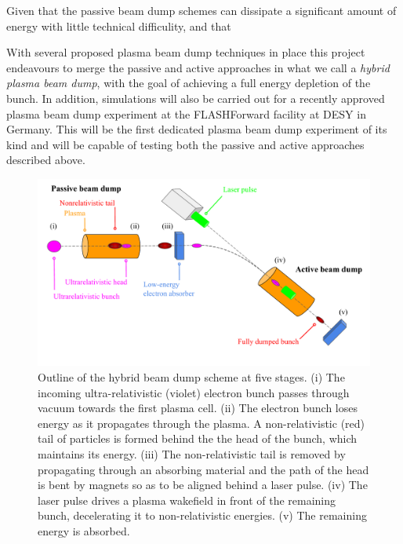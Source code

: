 Given that the passive beam dump schemes can dissipate a significant amount of energy with little technical difficulity, and that 

With several proposed plasma beam dump techniques in place this project endeavours to merge the passive and active approaches in what we call a \textit{hybrid plasma beam dump}, with the goal of achieving a full energy depletion of the bunch. In addition, simulations will also be carried out for a recently approved plasma beam dump experiment at the FLASHForward facility at DESY in Germany. This will be the first dedicated plasma beam dump experiment of its kind and will be capable of testing both the passive and active approaches described above. 
\begin{figure}
\centering
\includegraphics[width=\textwidth]{hybrid_outline5.pdf} %
\caption{\small{Outline of the hybrid beam dump scheme at five stages. (i) The incoming ultra-relativistic (violet) electron bunch passes through vacuum towards the first plasma cell. (ii) The electron bunch loses energy as it propagates through the plasma. A non-relativistic (red) tail of particles is formed behind the the head of the bunch, which maintains its energy. (iii) The non-relativistic tail is removed by propagating through an absorbing material and the path of the head is bent by magnets so as to be aligned behind a laser pulse. (iv) The laser pulse drives a plasma wakefield in front of the remaining bunch, decelerating it to non-relativistic energies. (v) The remaining energy is absorbed.}} %
\label{hybrid_outline}
\end{figure}
